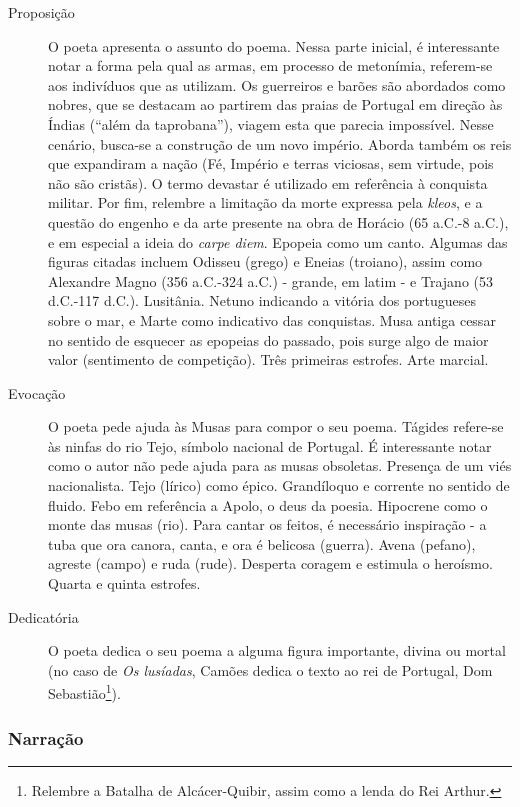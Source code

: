 \begin{description}
\item[Proposição] O poeta apresenta o assunto do poema. Nessa parte inicial, é interessante notar a forma pela qual as armas, em processo de metonímia, referem-se aos indivíduos que as utilizam. Os guerreiros e barões são abordados como nobres, que se destacam ao partirem das praias de Portugal em direção às Índias (``além da taprobana''), viagem esta que parecia impossível. Nesse cenário, busca-se a construção de um novo império. Aborda também os reis que expandiram a nação (Fé, Império e terras viciosas, sem virtude, pois não são cristãs). O termo devastar é utilizado em referência à conquista militar. Por fim, relembre a limitação da morte expressa pela \textit{kleos}, e a questão do engenho e da arte presente na obra de Horácio (65 a.C.-8 a.C.), e em especial a ideia do \textit{carpe diem}. Epopeia como um canto. Algumas das figuras citadas incluem Odisseu (grego) e Eneias (troiano), assim como Alexandre Magno (356 a.C.-324 a.C.) - grande, em latim - e Trajano (53 d.C.-117 d.C.). Lusitânia. Netuno indicando a vitória dos portugueses sobre o mar, e Marte como indicativo das conquistas. Musa antiga cessar no sentido de esquecer as epopeias do passado, pois surge algo de maior valor (sentimento de competição). Três primeiras estrofes. Arte marcial.
\item[Evocação] O poeta pede ajuda às Musas para compor o seu poema. Tágides refere-se às ninfas do rio Tejo, símbolo nacional de Portugal. É interessante notar como o autor não pede ajuda para as musas obsoletas. Presença de um viés nacionalista. Tejo (lírico) como épico. Grandíloquo e corrente no sentido de fluido. Febo em referência a Apolo, o deus da poesia. Hipocrene como o monte das musas (rio). Para cantar os feitos, é necessário inspiração - a tuba que ora canora, canta, e ora é belicosa (guerra). Avena (pefano), agreste (campo) e ruda (rude). Desperta coragem e estimula o heroísmo. Quarta e quinta estrofes.
\item[Dedicatória] O poeta dedica o seu poema a alguma figura importante, divina ou mortal (no caso de \textit{Os lusíadas}, Camões dedica o texto ao rei de Portugal, Dom Sebastião\footnote{Relembre a Batalha de Alcácer-Quibir, assim como a lenda do Rei Arthur.}).
\end{description}

\subsubsection{Narração}

